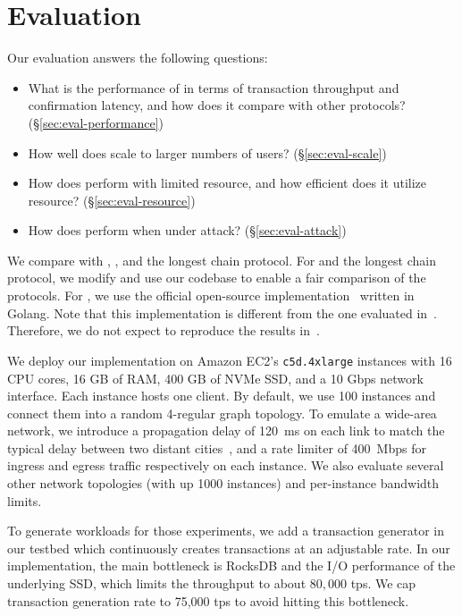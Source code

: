 \chapter{Evaluation}
\label{sec:eval}

Our evaluation answers the following questions:

\begin{itemize}
    \item What is the performance of \prism in terms of transaction throughput and confirmation latency, and how does it compare with other protocols? (\S\ref{sec:eval-performance})
    \item How well does \prism scale to larger numbers of users? (\S\ref{sec:eval-scale})
    \item How does \prism perform with limited resource, and how efficient does it utilize resource? (\S\ref{sec:eval-resource})
    \item How does \prism perform when under attack? (\S\ref{sec:eval-attack})
\end{itemize}


 We compare \prism with \algorand, \bng, and the longest chain protocol. For \bng and the longest chain protocol, we modify and use our \prism codebase to enable a fair comparison of the protocols. For \algorand, we use the official open-source implementation~\cite{algorandcode} written in Golang. Note that this implementation is different from the one evaluated in~\cite{algorand}. Therefore, we do not expect to reproduce the results in~\cite{algorand}.

 We deploy our \prism implementation on Amazon EC2's \texttt{c5d.4xlarge} instances with 16 CPU cores, 16 GB of RAM, 400 GB of NVMe SSD, and a 10 Gbps network interface. Each instance hosts one \prism client. By default, we use 100 instances and connect them into a random 4-regular graph topology. To emulate a wide-area network, we introduce a propagation delay of 120~ms on each link to match the typical delay between two distant cities~\cite{pingmeasurement}, and a rate limiter of 400~Mbps for ingress and egress traffic respectively on each instance. We also evaluate several other network topologies (with up 1000 instances) and per-instance bandwidth limits.

To generate workloads for those experiments, we add a transaction generator in our testbed which continuously creates transactions at an adjustable rate. In our \prism implementation, the main bottleneck is RocksDB and the I/O performance of the underlying SSD, which limits the throughput to about $80,000$ tps. 
We cap transaction generation rate to 75,000 tps to avoid hitting this bottleneck.


